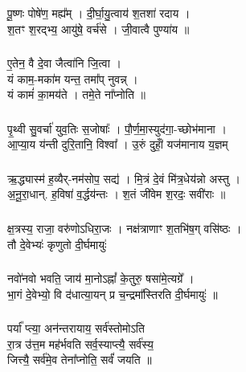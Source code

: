 \subsubsection{}
पू॒ष्णः पोषे॑ण॒ मह्य᳚म् । दी॒र्घा॒यु॒त्वाय॑ श॒तशा॑ रदाय ।\\
श॒तꣳ श॒रद्भ्य॒ आयु॑षे॒ वर्च॑से । जी॒वात्वै पुण्या॑य ॥\\
\subsubsection{}
ए॒तेन॒ वै दे॒वा जैत्वा॑नि जि॒त्वा ।\\
यं काम॒-मका॑म यन्त॒ तमा᳚प् नुवन्न् ।\\
यं कामं॑ का॒मय॑ते । तमे॒ते ना᳚प्नोति ॥\\
\subsubsection{}
पृ॒थ्वी सु॒वर्चा॑ युव॒तिः स॒जोषाः᳚ । पौ॒र्ण॒मा॒स्युद॑गा॒-च्छोभ॑माना ।\\
आ॒प्या॒य य॑न्ती दुरि॒तानि॒ विश्वा᳚ । उ॒रुं दुहांँ॒ यज॑मानाय य॒ज्ञम्\\
\subsubsection{}
ऋ॒द्ध्यास्म॑ ह॒व्यैर्-नम॑सोप॒ सद्य॑ । मि॒त्रं दे॒वं मि॑त्र॒धेय॑न्नो अस्तु ।\\
अ॒नू॒रा॒धान्. ह॒विषा॑ व॒र्द्धय॑न्तः । श॒तं जी॑वेम श॒रदः॒ सवी॑राः ॥\\
\subsubsection{}
क्ष॒त्रस्य॒ राजा॒ वरु॑णोऽधिरा॒जः । नक्ष॑त्राणाꣳ श॒तभि॑ष॒ग् वसि॑ष्ठः ।\\
तौ दे॒वेभ्यः॑ कृणुतो दी॒र्घमायुः॑\\
\subsubsection{}
नवो॑नवो भवति॒ जाय॑ मा॒नोऽह्नां᳚ के॒तुरु॒ षसा॑मे॒त्यग्रे᳚ ।\\
भा॒गं दे॒वेभ्यो॒ वि द॑धात्या॒यन् प्र च॒न्द्रमा᳚स्तिरति दी॒र्घमायुः॑ ॥\\
\subsubsection{}
पर्या᳚ प्त्या॒ अन॑न्तरायाय॒ सर्व॑स्तोमोऽति \\
रा॒त्र उ॑त्त॒म मह॑र्भवति सर्व॒स्याप्त्यै॒ सर्व॑स्य॒ \\
जित्त्यै॒ सर्व॑मे॒व तेना᳚प्नोति॒ सर्वं॑ जयति ॥\\
